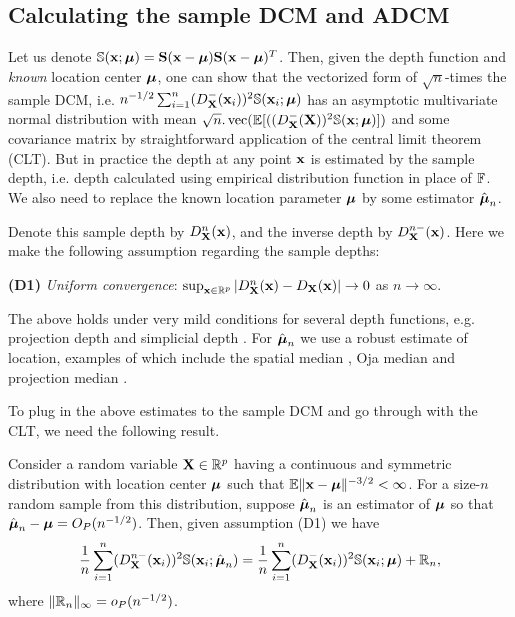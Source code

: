 \subsection{Calculating the sample DCM and ADCM}
Let us denote ${\mathbb{S}}({\bf{x}}; {\boldsymbol{\mu}}) = {\mathbf{S}}({\bf{x}} - {\boldsymbol{\mu}}) {\mathbf{S}}({\bf{x}} - {\boldsymbol{\mu}})^T$. Then, given the depth function and {\it known} location center ${\boldsymbol{\mu}}$, one can show that the vectorized form of $\sqrt n$-times the sample DCM, i.e. $n^{-1/2} \sum_{i=1}^n (D^-_{\mathbf{X}}({\bf{x}}_i))^2 {\mathbb{S}} ({\bf{x}}_i; {\boldsymbol{\mu}})$  has an asymptotic multivariate normal distribution with mean $\sqrt n. \operatorname*{vec}( {\mathbb{E}} [( (D^-_{\mathbf{X}} ({\mathbf{X}}))^2 {\mathbb{S}}({\bf{x}}; {\boldsymbol{\mu}})])$ and some covariance matrix by straightforward application of the central limit theorem (CLT). But in practice the depth at any point ${\bf{x}}$ is estimated by the sample depth, i.e. depth calculated using empirical distribution function in place of ${\mathbb{F}}$. We also need to replace the known location parameter ${\boldsymbol{\mu}}$ by some estimator $\hat{{\boldsymbol{\mu}}}_n$.

Denote this sample depth by $D^n_{\mathbf{X}} ({\bf{x}})$, and the inverse depth by $D^{n-}_{\mathbf{X}} ({\bf{x}})$. Here we make the following assumption regarding the sample depths:

\vspace{1em}
\noindent\textbf{(D1)} \textit{Uniform convergence}: $\sup_{{\bf{x}} \in \mathbb R^p} | D^n_{\mathbf{X}} ({\bf{x}}) - D_{\mathbf{X}} ({\bf{x}}) | \rightarrow 0$ as $n \rightarrow \infty $.
\vspace{1em}

\noindent The above holds under very mild conditions for several depth functions, e.g. projection depth \citep{zuo03} and simplicial depth \citep{Dumbgen92}. For $\hat {{\boldsymbol{\mu}}}_n$ we use a robust estimate of location, examples of which include the spatial median \citep{haldane48,brown83}, Oja median \citep{oja83} and projection median \citep{zuo03}.

To plug in the above estimates to the sample DCM and go through with the CLT, we need the following result.

\begin{Lemma} \label{Lemma:lemma1}
Consider a random variable ${\mathbf{X}} \in \mathbb{R}^p$ having a continuous and symmetric distribution with location center ${\boldsymbol{\mu}}$ such that ${\mathbb{E}} \|{\bf{x}} - {\boldsymbol{\mu}} \|^{-3/2} < \infty$. For a size-$n$ random sample from this distribution, suppose $\hat{{\boldsymbol{\mu}}}_n$ is an estimator of ${\boldsymbol{\mu}}$ so that $\hat{{\boldsymbol{\mu}}}_n - {\boldsymbol{\mu}} = O_P(n^{-1/2}) $. Then, given assumption (D1) we have
%
$$
\frac{1}{n} \sum_{i=1}^n (D^{n-}_{\mathbf{X}} ({\bf{x}}_i))^2 {\mathbb{S}}({\bf{x}}_i; \hat{{\boldsymbol{\mu}}}_n) = \frac{1}{n} \sum_{i=1}^n (D^-_{\mathbf{X}} ({\bf{x}}_i))^2 {\mathbb{S}}({\bf{x}}_i; {\boldsymbol{\mu}})
+ {\mathbb{R}}_n,
$$
%
where $\| {\mathbb{R}}_n \|_\infty = o_P(n^{-1/2})$.
\end{Lemma}

